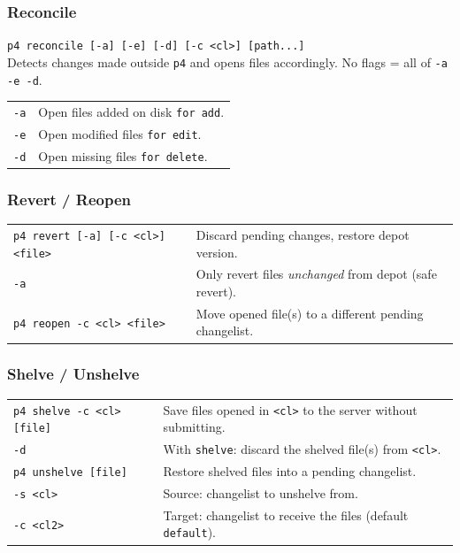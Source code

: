 \subsubsection*{Reconcile}

\texttt{p4 reconcile [-a] [-e] [-d] [-c <cl>] [path...]}\\
Detects changes made outside \texttt{p4} and opens files
accordingly. No flags = all of \texttt{-a -e -d}.

\begin{tabularx}{\linewidth}{lX}
    \texttt{-a} & Open files added on disk \texttt{for add}.\\
    \texttt{-e} & Open modified files \texttt{for edit}.\\
    \texttt{-d} & Open missing files \texttt{for delete}.\\
\hline
\end{tabularx}


\subsubsection*{Revert / Reopen}

\begin{tabularx}{\linewidth}{lX}
    \texttt{p4 revert [-a] [-c <cl>] <file>}
                & Discard pending changes, restore depot version.\\
    \texttt{-a} & Only revert files \textit{unchanged} from depot
                    (safe revert).\\
\hline
    \texttt{p4 reopen -c <cl> <file>}
                & Move opened file(s) to a different pending
                    changelist.\\
\hline
\end{tabularx}


\subsubsection*{Shelve / Unshelve}

\begin{tabularx}{\linewidth}{lX}
    \texttt{p4 shelve -c <cl> [file]}
                & Save files opened in \texttt{<cl>} to the server
                    without submitting.\\
    \texttt{-d} & With \texttt{shelve}: discard the shelved
                    file(s) from \texttt{<cl>}.\\
\hline
    \texttt{p4 unshelve [file]}
                & Restore shelved files into a pending
                    changelist.\\
    \texttt{-s <cl>}  & Source: changelist to unshelve from.\\
    \texttt{-c <cl2>} & Target: changelist to receive the files
                          (default \texttt{default}).\\
\hline
\end{tabularx}


